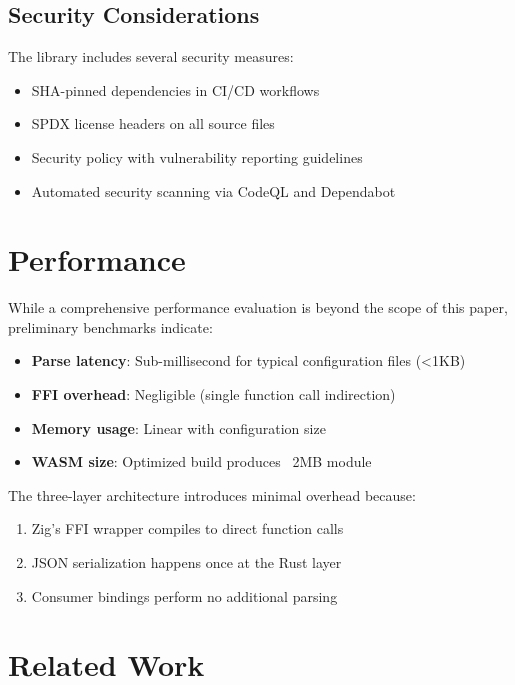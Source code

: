 \documentclass[11pt,a4paper]{article}
\begin{document}
\subsection{Security Considerations}

The library includes several security measures:

\begin{itemize}
    \item SHA-pinned dependencies in CI/CD workflows
    \item SPDX license headers on all source files
    \item Security policy with vulnerability reporting guidelines
    \item Automated security scanning via CodeQL and Dependabot
\end{itemize}

\section{Performance}

While a comprehensive performance evaluation is beyond the scope of this paper, preliminary benchmarks indicate:

\begin{itemize}
    \item \textbf{Parse latency}: Sub-millisecond for typical configuration files (<1KB)
    \item \textbf{FFI overhead}: Negligible (single function call indirection)
    \item \textbf{Memory usage}: Linear with configuration size
    \item \textbf{WASM size}: Optimized build produces ~2MB module
\end{itemize}

The three-layer architecture introduces minimal overhead because:

\begin{enumerate}
    \item Zig's FFI wrapper compiles to direct function calls
    \item JSON serialization happens once at the Rust layer
    \item Consumer bindings perform no additional parsing
\end{enumerate}

\section{Related Work}
\end{document}
